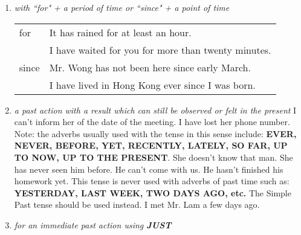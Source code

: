 \begin{enumerate}
    \item {\it with ``for" + a period of time or ``since" + a point of time}
        \newline
        \newline
        \begin{tabular}{ll}
            for & It has rained for at least an hour. \\
                & I have waited for you for more than twenty minutes. \\
            since & Mr. Wong has not been here since early March. \\
                  & I have lived in Hong Kong ever since I was born.
        \end{tabular}
    \item {\it a past action with a result which can still be observed or felt in the present}
        \newline
        \newline
        I can't inform her of the date of the meeting.
        I have lost her phone number.
        \newline
        \newline
        Note: the adverbs usually used with the tense in this sense include:
        \newline
        \textbf{EVER, NEVER, BEFORE, YET, RECENTLY, LATELY, SO FAR, UP TO NOW,
        UP TO THE PRESENT}.
        \newline
        \newline
        She doesn't know that man. She has never seen him before.
        \newline
        \newline
        He can't come with us. He hasn't finished his homework yet.
        \newline
        \newline
        This tense is never used with adverbs of past time such as:
        \newline
        \textbf{YESTERDAY, LAST WEEK, TWO DAYS AGO, etc.}
        The Simple Past tense should be used instead.
        \newline
        \newline
        I met Mr. Lam a few days ago.
    \item {\it for an immediate past action using \textbf{JUST}}
        \newline
        \newline
        \begin{tabular}{ll}

\end{tabular}
\end{enumerate}
